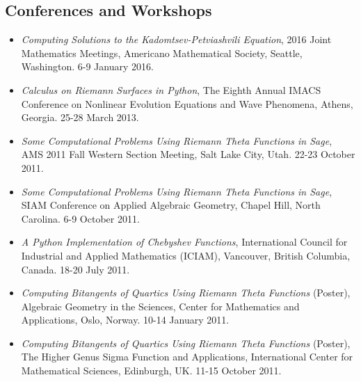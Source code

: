 \documentclass{article}
\begin{document}
\subsection*{Conferences and Workshops}
\begin{itemize}
\item {\it Computing Solutions to the Kadomtsev-Petviashvili Equation}, 2016
  Joint Mathematics Meetings, Americano Mathematical Society, Seattle,
  Washington. 6-9 January 2016.
  \item {\it Calculus on Riemann Surfaces in Python}, The Eighth
    Annual IMACS Conference on Nonlinear Evolution Equations and Wave
    Phenomena, Athens, Georgia. 25-28 March 2013.
  \item {\it Some Computational Problems Using Riemann Theta
    Functions in Sage}, AMS 2011 Fall Western Section Meeting, Salt
    Lake City, Utah. 22-23 October 2011.
  \item {\it Some Computational Problems Using Riemann Theta
    Functions in Sage}, SIAM Conference on Applied Algebraic
    Geometry, Chapel Hill, North Carolina. 6-9 October 2011.
  \item {\it A Python Implementation of Chebyshev Functions},
    International Council for Industrial and Applied Mathematics
    (ICIAM), Vancouver, British Columbia, Canada. 18-20 July 2011.
  \item {\it Computing Bitangents of Quartics Using Riemann Theta
    Functions} (Poster), Algebraic Geometry in the Sciences, Center
    for Mathematics and Applications, Oslo, Norway. 10-14 January
    2011.
  \item {\it Computing Bitangents of Quartics Using Riemann Theta
    Functions} (Poster), The Higher Genus Sigma Function and
    Applications, International Center for Mathematical Sciences,
    Edinburgh, UK. 11-15 October 2011.
\end{itemize}
\end{document}
